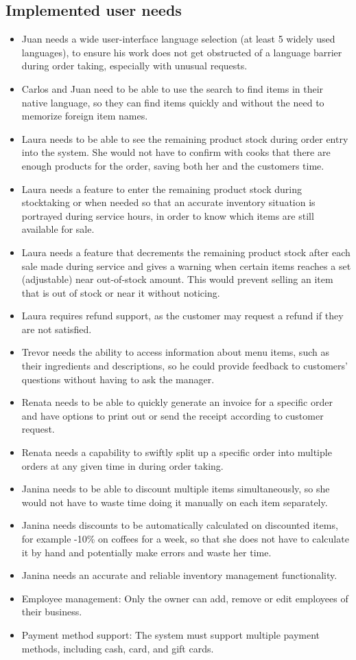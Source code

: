 \documentclass{article}
\begin{document}
\subsection{Implemented user needs}
\begin{itemize}
\item Juan needs a wide user-interface language selection (at least 5 widely
used languages), to ensure his work does not get obstructed of a language
barrier during order taking, especially with unusual requests.
\item  Carlos and Juan need to be able to use the search to find items in their
native language, so they can find items quickly and without the need to
memorize foreign item names.
\item  Laura needs to be able to see the remaining product stock during order
entry into the system. She would not have to confirm with cooks that there
are enough products for the order, saving both her and the customers time.
\item Laura needs a feature to enter the remaining product stock during stocktaking or when needed so that an accurate inventory situation is portrayed
during service hours, in order to know which items are still available for
sale.
\item  Laura needs a feature that decrements the remaining product stock after
each sale made during service and gives a warning when certain items
reaches a set (adjustable) near out-of-stock amount. This would prevent
selling an item that is out of stock or near it without noticing.
\item Laura requires refund support, as the customer may request a refund if
they are not satisfied.
\item Trevor needs the ability to access information about menu items, such as
their ingredients and descriptions, so he could provide feedback to customers’ questions without having to ask the manager.
\item Renata needs to be able to quickly generate an invoice for a specific order
and have options to print out or send the receipt according to customer
request.
\item  Renata needs a capability to swiftly split up a specific order into multiple
orders at any given time in during order taking.
\item Janina needs to be able to discount multiple items simultaneously, so she
would not have to waste time doing it manually on each item separately.
\item  Janina needs discounts to be automatically calculated on discounted items,
for example -10\% on coffees for a week, so that she does not have to
calculate it by hand and potentially make errors and waste her time.
\item  Janina needs an accurate and reliable inventory management functionality.
\item Employee management: Only the owner can add, remove or edit employees
of their business.
\item Payment method support: The system must support multiple payment
methods, including cash, card, and gift cards.
\end{itemize}
\end{document}
